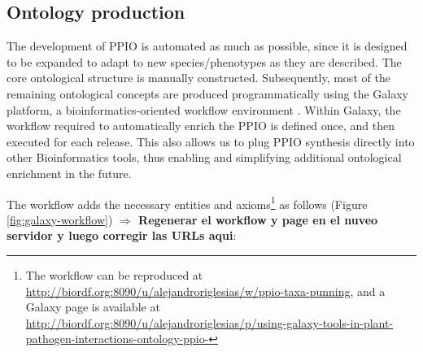 \documentclass[sw]{iosart2c}
\newcommand{\todo}[1]{\textbf{{\color{blue}$\Longrightarrow$ #1}}}
\begin{document}
\subsection{Ontology production}
The development of PPIO is automated as much as possible, since it is designed to be expanded to adapt to new species/phenotypes as they are described. The core ontological structure is manually constructed. Subsequently, most of the remaining ontological concepts are produced programmatically using the Galaxy platform, a bioinformatics-oriented workflow environment \cite{galaxy}. Within Galaxy, the workflow required to automatically enrich the PPIO is defined once, and then executed for each release. This also allows us to plug PPIO synthesis directly into other Bioinformatics tools, thus enabling and simplifying additional ontological enrichment in the future.

The workflow adds the necessary entities and axioms\footnote{The workflow can be reproduced at \url{http://biordf.org:8090/u/alejandroriglesias/w/ppio-taxa-punning}, and a Galaxy page is available at \url{http://biordf.org:8090/u/alejandroriglesias/p/using-galaxy-tools-in-plant-pathogen-interactions-ontology-ppio-}} as follows (Figure \ref{fig:galaxy-workflow}) \todo{Regenerar el workflow y page en el nuveo servidor y luego corregir las URLs aqui}:
\end{document}
